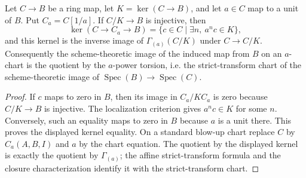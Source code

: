 \begin{lemma}
  \label{lemma:nagata-scheme-image-affine-saturation}

  Let $C\to B$ be a ring map, let $K=\ker(C\to B)$, and let $a\in C$ map
  to a unit of $B$.  Put $C_a=C[1/a]$.  If $C/K\to B$ is injective, then
  \[
    \ker(C\longrightarrow C_a\longrightarrow B)
      =\{c\in C\mid \exists n,\ a^nc\in K\},
  \]
  and this kernel is the inverse image of
  $\Gamma_{(a)}(C/K)$ under $C\to C/K$.
  Consequently the scheme-theoretic image of the induced map from $B$ on an
  $a$-chart is the quotient by the $a$-power torsion, i.e. the strict-transform
  chart of the scheme-theoretic image of $\operatorname{Spec}(B)\to
  \operatorname{Spec}(C)$.
\end{lemma}

\begin{proof}
  If $c$ maps to zero in $B$, then its image in $C_a/KC_a$ is zero because
  $C/K\to B$ is injective.  The localization criterion gives
  $a^nc\in K$ for some $n$.  Conversely, such an equality maps to zero in $B$
  because $a$ is a unit there.  This proves the displayed kernel equality.
  On a standard blow-up chart replace $C$ by $C_a(A,B,I)$ and $a$ by the
  chart equation.  The quotient by the displayed kernel is exactly the
  quotient by $\Gamma_{(a)}$; the affine strict-transform formula and the
  closure characterization identify it with the strict-transform chart.
\end{proof}

